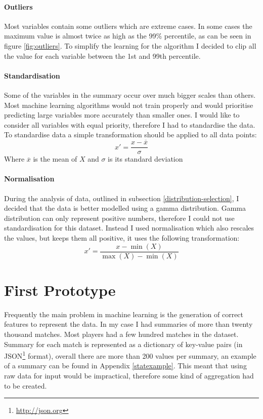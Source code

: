 \documentclass[12pt,a4paper]{book}
\newcommand\mean[1]{\overline{#1}}
\begin{document}
\paragraph{Outliers}
Most variables contain some outliers which are extreme cases.
In some cases the maximum value is almost twice as high as the 99\% percentile, as can be seen in figure \ref{fig:outliers}.
To simplify the learning for the algorithm I decided to clip all the value for each variable between the 1st and 99th percentile.
\paragraph{Standardisation}
Some of the variables in the summary occur over much bigger scales than others.
Most machine learning algorithms would not train properly and would prioritise predicting large variables more accurately than smaller ones.
I would like to consider all variables with equal priority, therefore I had to standardise the data.
To standardise data a simple transformation should be applied to all data points:
\begin{equation*}
x' = \frac{x - \mean{x}}{\sigma}
\end{equation*}
Where $\mean{x}$ is the mean of $X$ and $\sigma$ is its standard deviation
\paragraph{Normalisation}
During the analysis of data, outlined in subsection \ref{distribution-selection}, I decided that the data is better modelled using a gamma distribution.
Gamma distribution can only represent positive numbers, therefore I could not use standardisation for this dataset.
Instead I used normalisation which also rescales the values, but keeps them all positive, it uses the following transformation:
\begin{equation*}
x' = \frac{x - \min(X)}{\max(X)-\min(X)}
\end{equation*}
\section{First Prototype}
Frequently the main problem in machine learning is the generation of correct features to represent the data.
In my case I had summaries of more than twenty thousand matches.
Most players had a few hundred matches in the dataset.
Summary for each match is represented as a dictionary of key-value pairs (in JSON\footnote{\url{http://json.org}} format), overall there are more than 200 values per summary, an example of a summary can be found in Appendix \ref{statexample}.
This meant that using raw data for input would be impractical, therefore some kind of aggregation had to be created.
\end{document}
